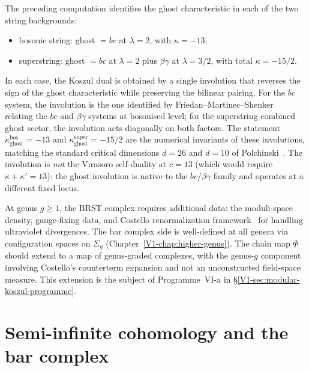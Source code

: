 \begin{remark}
\label{rem:ghost-superghost-koszul}
The preceding computation identifies the ghost characteristic in
each of the two string backgrounds:
\begin{itemize}[nosep]
\item bosonic string: ghost $= bc$ at $\lambda = 2$, with
 $\kappa = -13$;
\item superstring: ghost $= bc$ at $\lambda = 2$ plus $\beta\gamma$
 at $\lambda = 3/2$, with total $\kappa = -15/2$.
\end{itemize}
In each case, the Koszul dual is obtained by a single involution
that reverses the sign of the ghost characteristic while preserving
the bilinear pairing. For the $bc$ system, the involution is
the one identified by Friedan--Martinec--Shenker~\cite{FMS86}
relating the $bc$ and $\beta\gamma$ systems at bosonised level;
for the superstring combined ghost sector, the involution acts
diagonally on both factors. The statement
$\kappa_{\mathrm{ghost}}^{\mathrm{bos}} = -13$ and
$\kappa_{\mathrm{ghost}}^{\mathrm{super}} = -15/2$ are the
numerical invariants of these involutions, matching the standard
critical dimensions $d = 26$ and $d = 10$ of
Polchinski~\cite{Polchinski1998}. The involution is
\emph{not} the Virasoro self-duality at $c = 13$
\textup{(}which would require $\kappa + \kappa' = 13$\textup{)}:
the ghost involution is native to the $bc$\slash$\beta\gamma$
family and operates at a different fixed locus.
\end{remark}

\begin{remark}
\label{rem:brst-bar-higher-genus}
At genus $g \geq 1$, the BRST complex requires additional data:
the moduli-space density, gauge-fixing data, and
Costello renormalization framework~\cite{costello-renormalization} for
handling ultraviolet divergences. The bar complex side is well-defined
at all genera via configuration spaces on $\Sigma_g$
(Chapter~\ref{V1-chap:higher-genus}). The chain map $\Phi$ should
extend to a map of genus-graded complexes, with the genus-$g$ component
involving Costello's counterterm expansion and not an unconstructed
field-space measure. This extension is the subject of Programme~VI-a in
\S\ref{V1-sec:modular-koszul-programme}.
\end{remark}

\section{Semi-infinite cohomology and the bar complex}
\label{sec:semi-infinite-bar}

